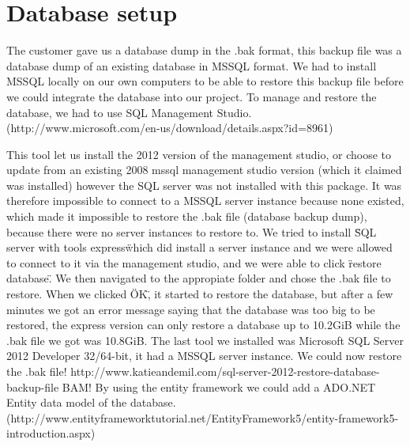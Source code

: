 \section{Database setup}
The customer gave us a database dump in the .bak format, this backup file was a database dump of an existing database in MSSQL format. We had to install MSSQL locally on our own computers to be able to restore this backup file before we could integrate the database into our project. To manage and restore the database, we had to use SQL Management Studio. (http://www.microsoft.com/en-us/download/details.aspx?id=8961)

This tool let us install the 2012 version of the management studio, or choose to update from an existing 2008 mssql management studio version (which it claimed was installed) however the SQL server was not installed with this package.
It was therefore impossible to connect to a MSSQL server instance because none existed, which made it impossible to restore the .bak file (database backup dump), because there were no server instances to restore to.
We tried to install \"SQL server with tools express\" which did install a server instance and we were allowed to connect to it via the management studio, and we were able to click \"restore database\". We then navigated to the appropiate folder and chose the .bak file to restore. When we clicked \"OK\", it started to restore the database, but after a few minutes we got an error message saying that the database was too big to be restored, the express version can only restore a database up to 10.2GiB while the .bak file we got was 10.8GiB.
The last tool we installed was Microsoft SQL Server 2012 Developer 32/64-bit, it had a MSSQL server instance.
We could now restore the .bak file! http://www.katieandemil.com/sql-server-2012-restore-database-backup-file BAM!
By using the entity framework we could add a ADO.NET Entity data model of the database. (http://www.entityframeworktutorial.net/EntityFramework5/entity-framework5-introduction.aspx)